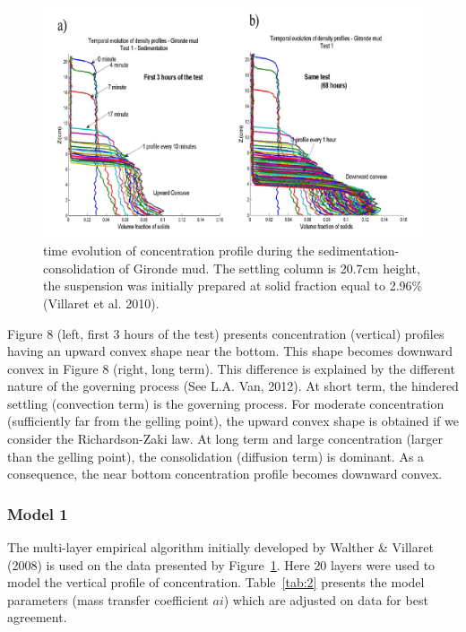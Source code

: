 \begin{figure}[H]
\begin{center}
\includegraphics[scale=0.1,angle=0]{graphics/fig8.png}
\caption{time evolution of concentration profile during the
sedimentation-consolidation of Gironde mud. The settling column is 20.7cm
height, the suspension was initially prepared at solid fraction equal to
2.96\% (Villaret et al. 2010).}\label{fig:8}
\end{center}
\end{figure}

Figure 8 (left, first 3 hours of the test) presents concentration (vertical)
profiles having an upward convex shape near the bottom. This shape becomes
downward convex in Figure 8 (right, long term). This difference is explained
by the different nature of the governing process (See L.A. Van, 2012). At
short term, the hindered settling (convection term) is the governing
process. For moderate concentration (sufficiently far from the gelling
point), the upward convex shape is obtained if we consider the
Richardson-Zaki law. At long term and large concentration (larger than the
gelling point), the consolidation (diffusion term) is dominant. As a
consequence, the near bottom concentration profile becomes downward convex.%

\subsubsection*{Model 1}
The multi-layer empirical algorithm initially developed by Walther \&
Villaret (2008) is used on the data presented by Figure~\ref{fig:8}. Here $20$ layers
were used to model the vertical profile of concentration. Table~\ref{tab:2} presents
the model parameters (mass transfer coefficient $ai$) which are adjusted on
data for best agreement.

